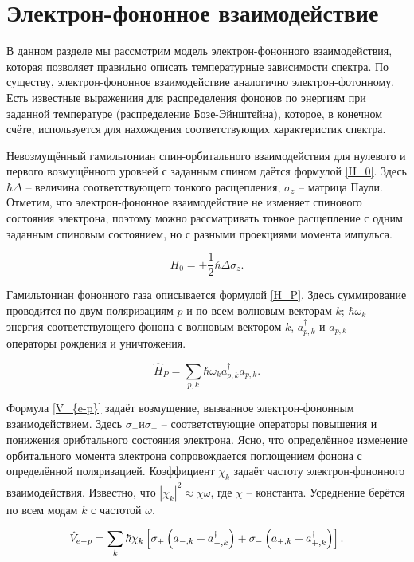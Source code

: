 \section{Электрон-фононное взаимодействие}
В данном разделе мы рассмотрим модель электрон-фононного взаимодействия,
которая позволяет правильно описать температурные зависимости спектра. 
По существу, электрон-фононное взаимодействие аналогично электрон-фотонному.
Есть известные выражениия для распределения фононов по энергиям при заданной
температуре (распределение Бозе-Эйнштейна), которое, в конечном счёте, используется
для нахождения соответствующих характеристик спектра.

Невозмущённый гамильтониан спин-орбитального взаимодействия для нулевого и первого
возмущённого уровней с заданным спином даётся формулой \ref{H_0}. 
Здесь $\hbar \Delta$ -- величина соответствующего тонкого расщепления,
$\sigma_z$ -- матрица Паули. Отметим, что электрон-фононное взаимодействие не 
изменяет спинового состояния электрона, поэтому можно рассматривать тонкое расщепление
с одним заданным спиновым состоянием, но с разными проекциями момента импульса.

\begin{equation}
    \label{H_0}
    H_0 = \pm \frac{1}{2} \hbar \Delta \sigma_z.
\end{equation}

Гамильтониан фононного газа описывается формулой \ref{H_P}. Здесь суммирование
проводится по двум поляризациям $p$ и по всем волновым векторам $k$; $\hbar \omega_k$ --
энергия соответствующего фонона с волновым вектором $k$, $a^{\dagger}_{p, k}$ и
$a_{p, k}$ -- операторы рождения и уничтожения. 

\begin{equation}
    \label{H_P}
    \hat{H}_P = \sum_{p, k} \hbar \omega_k a^{\dagger}_{p, k} a_{p, k}.
\end{equation}

Формула \ref{V_{e-p}} задаёт возмущение, вызванное электрон-фононным взаимодействием.
Здесь $\sigma_{-} и \sigma_{+}$ -- соответствующие операторы повышения и понижения
орибтального состояния электрона. Ясно, что определённое изменение орбитального момента
электрона сопровождается поглощением фонона с определённой поляризацией. Коэффициент
$\chi_k$ задаёт частоту электрон-фононного взаимодействия. Известно, что 
$\overline{|\chi_k|^2} \approx \chi \omega$, где $\chi$ -- константа. Усреднение берётся
по всем модам $k$ с частотой $\omega$.

\begin{equation}
    \label{V_{e-p}}
    \hat{V}_{e-p} = \sum_{k} \hbar \chi_k \left[\sigma_{+}\left(a_{-, k}
    + a^{\dagger}_{-, k} \right) + \sigma_{-} \left(a_{+, k} + a^{\dagger}_{+, k}
     \right)   \right].
\end{equation}



